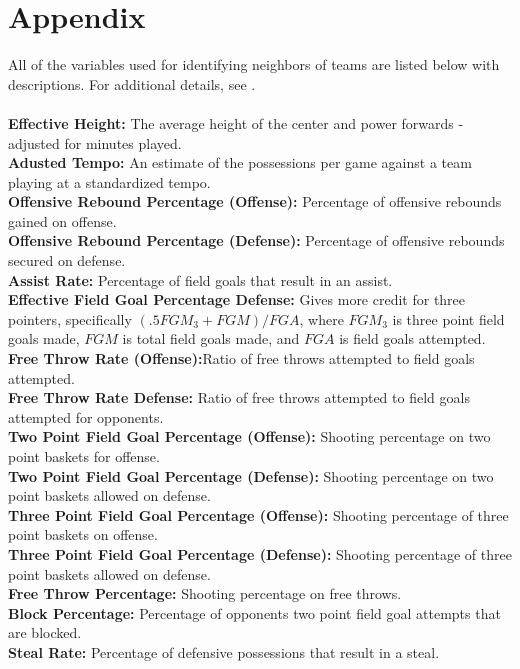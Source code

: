 \documentclass[letterpaper,12pt]{article}
\begin{document}
\section*{Appendix}
\footnotesize
All of the variables used for identifying neighbors of teams are listed below with descriptions. For additional details, see \cite{kenpom.com}.\\
\\
\textbf{Effective Height:} The average height of the center and power forwards - adjusted for minutes played.  \\
\textbf{Adusted Tempo:} An estimate of the possessions per game against a team playing at a standardized tempo. \\
\textbf{Offensive Rebound Percentage (Offense):} Percentage of offensive rebounds gained on offense.\\
\textbf{Offensive Rebound Percentage (Defense):} Percentage of offensive rebounds secured on defense.\\
\textbf{Assist Rate:} Percentage of field goals that result in an assist.\\
\textbf{Effective Field Goal Percentage Defense:} Gives more credit for three pointers, specifically $(.5 FGM_3 + FGM) /FGA$, where $FGM_3$ is three point field goals made, $FGM$ is total field goals made, and  $FGA$ is field goals attempted. \\
\textbf{Free Throw Rate (Offense):}Ratio of free throws attempted to field goals attempted. \\
\textbf{Free Throw Rate Defense:} Ratio of free throws attempted to field goals attempted for opponents. \\
\textbf{Two Point Field Goal Percentage (Offense):} Shooting percentage on two point baskets for offense. \\
\textbf{Two Point Field Goal Percentage (Defense):} Shooting percentage on two point baskets allowed on defense.\\
\textbf{Three Point Field Goal Percentage (Offense):} Shooting percentage of three point baskets on offense.\\
\textbf{Three Point Field Goal Percentage (Defense):} Shooting percentage of three point baskets allowed on defense.\\
\textbf{Free Throw Percentage:} Shooting percentage on free throws.\\
\textbf{Block Percentage:} Percentage of opponents two point field goal attempts that are blocked.\\
\textbf{Steal Rate:} Percentage of defensive possessions that result in a steal. \\
\end{document}
